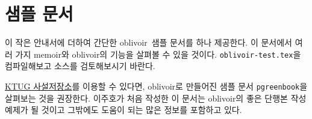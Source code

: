 \documentclass[
	12pt,
	a4paper,
	kosection,
	footnote,
	microtype,
	figtabcapt,
]{oblivoir}
\def\myLabel#1#2{\label{#1}}
\def\myLabel#1#2{\label{#2}}
\newcommand\obclass{ob\-liv\-oir\oblivoirallowbreak}
\begin{document}
\section{샘플 문서}

이 작은 안내서에 더하여 간단한 \obclass\ 샘플 문서를 하나 제공한다.
이 문서에서 여러 가지 memoir와 \obclass 의 기능을 살펴볼 수 있을 것이다.
\texttt{oblivoir-test.tex}을 컴파일해보고 소스를 검토해보시기 바란다.

\href{http://wiki.ktug.org/wiki/wiki.php/KtugPrivateRepository}{KTUG 사설저장소}를 이용할 수 있다면, \obclass 로 만들어진 샘플 문서 \texttt{pgreenbook}을
살펴보는 것을 권장한다. 이주호가 처음 작성한 이 문서는 \obclass 의 좋은 단행본 작성 예제가
될 것이고 그밖에도 도움이 되는 많은 정보를 포함하고 있다.

%
%
\end{document}
